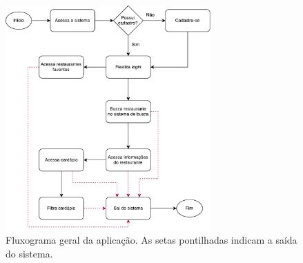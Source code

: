 \begin{figure}[H]
    \centering\includegraphics[width=0.7\textwidth]{pdf/fluxograma-usuario.pdf}
    \caption[Fluxograma Geral do Sistema]{\label{fig:fluxograma}Fluxograma geral da aplicação. As setas pontilhadas indicam a saída do sistema.}
\end{figure}